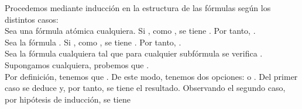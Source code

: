\begin{isabellebody}
\begin{isamarkuptext}
  \begin{demostracion}
  Procedemos mediante inducción en la estructura de las fórmulas según los distintos casos:\\
    Sea  una fórmula atómica cualquiera. Si , como
    , se tiene . Por tanto, 
    .\\
    Sea la fórmula \isa{{\isasymbottom}}. Si , como
    , se tiene . Por tanto, 
    .\\
    Sea la fórmula  cualquiera tal que para cualquier subfórmula  se 
    verifica . Supongamos  cualquiera, probemos que 
    .\\
    Por definición, tenemos que . De este modo, tenemos dos opciones:
     o . Del primer caso se deduce  y, por tanto, se tiene el
    resultado. Observando el segundo caso, por hipótesis de inducción, se tiene 

\end{demostracion}
\end{isamarkuptext}
\end{isabellebody}
